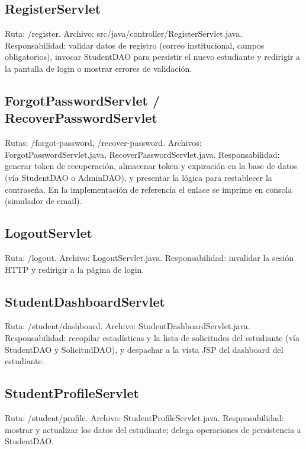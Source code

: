 \documentclass[12pt,letterpaper]{article}
\newcommand{\code}[1]{\texorpdfstring{\begingroup\normalfont\normalsize\def\_{\textunderscore\allowbreak}#1\endgroup}{#1}}
\begin{document}
\subsection*{RegisterServlet}
Ruta: \code{/register}. Archivo: \code{src/java/controller/RegisterServlet.java}.
Responsabilidad: validar datos de registro (correo institucional, campos obligatorios), invocar \code{StudentDAO} para persistir el nuevo estudiante y redirigir a la pantalla de login o mostrar errores de validación.

\subsection*{ForgotPasswordServlet / RecoverPasswordServlet}
Rutas: \code{/forgot-password}, \code{/recover-password}. Archivos: \code{ForgotPasswordServlet.java}, \code{RecoverPasswordServlet.java}.
Responsabilidad: generar token de recuperación, almacenar token y expiración en la base de datos (vía \code{StudentDAO} o \code{AdminDAO}), y presentar la lógica para restablecer la contraseña. En la implementación de referencia el enlace se imprime en consola (simulador de email).

\subsection*{LogoutServlet}
Ruta: \code{/logout}. Archivo: \code{LogoutServlet.java}.
Responsabilidad: invalidar la sesión HTTP y redirigir a la página de login.

\subsection*{StudentDashboardServlet}
Ruta: \code{/student/dashboard}. Archivo: \code{StudentDashboardServlet.java}.
Responsabilidad: recopilar estadísticas y la lista de solicitudes del estudiante (vía \code{StudentDAO} y \code{SolicitudDAO}), y despachar a la vista JSP del dashboard del estudiante.

\subsection*{StudentProfileServlet}
Ruta: \code{/student/profile}. Archivo: \code{StudentProfileServlet.java}.
Responsabilidad: mostrar y actualizar los datos del estudiante; delega operaciones de persistencia a \code{StudentDAO}.
\end{document}
